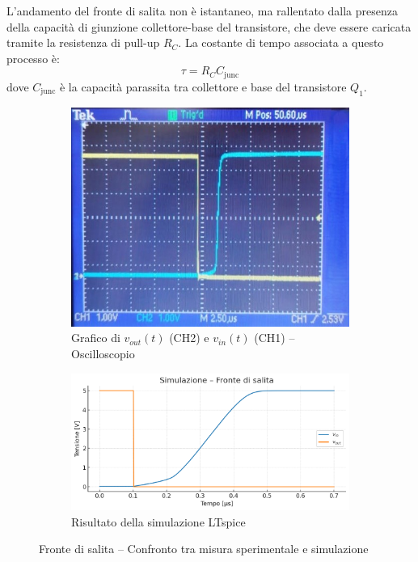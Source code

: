 \documentclass[a4paper,12pt]{article}
\begin{document}
L’andamento del fronte di salita non è istantaneo, ma rallentato dalla presenza della capacità di giunzione collettore-base del transistore, che deve essere caricata tramite la resistenza di pull-up \(R_C\). La costante di tempo associata a questo processo è:
\[
\tau = R_C C_{\text{junc}}
\]
dove \(C_{\text{junc}}\) è la capacità parassita tra collettore e base del transistore \(Q_1\).

\begin{figure}[H] \label{fig: salita}
  \centering
  \begin{subfigure}{0.7\textwidth}
    \includegraphics[width=\linewidth]{salita_def.jpg}
    \caption{Grafico di \(v_{out}(t)\) (CH2) e \(v_{in}(t)\) (CH1) – Oscilloscopio}
  \end{subfigure}
  \hspace{0.05\textwidth}
  \begin{subfigure}{0.9\textwidth}
    \includegraphics[width=\linewidth]{salita_sim2.png}
    \caption{Risultato della simulazione LTspice}
  \end{subfigure}
  \caption{Fronte di salita – Confronto tra misura sperimentale e simulazione}
\end{figure}
\end{document}

